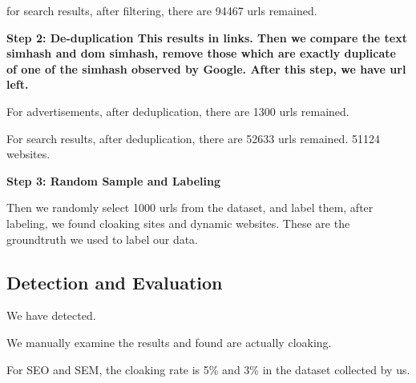 for search results, after filtering, there are 94467 urls remained.


\bf{Step 2: De-duplication}
This results in  links. Then we compare the text simhash and dom
simhash, remove those which are exactly duplicate of one of the simhash observed
by Google. After this step, we have  url left.

For advertisements, after deduplication, there are 1300 urls remained.

For search results, after deduplication, there are 52633 urls remained.
51124 websites.

\bf{Step 3: Random Sample and Labeling}


Then we randomly select 1000 urls from the dataset, and label them, after
labeling, we found  cloaking sites and  dynamic websites.
These are the groundtruth we used to label our data.

\subsection{Detection and Evaluation}
We have detected.

We manually examine the results and found  are actually cloaking.

For SEO and SEM, the cloaking rate is 5\% and 3\% in the dataset collected by
us.



